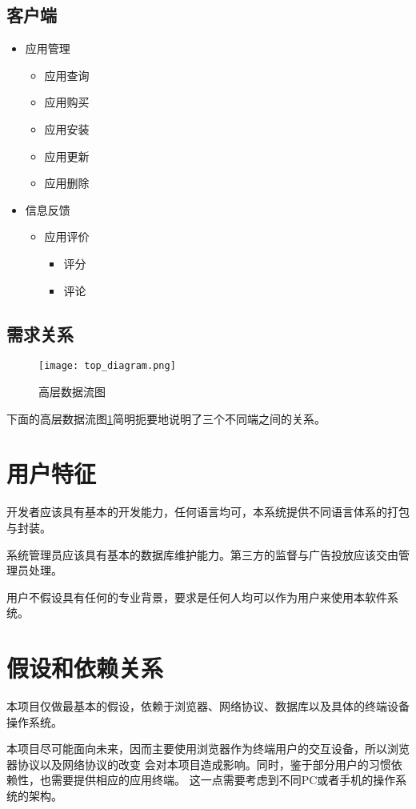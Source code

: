 \subsection{客户端}
\begin{itemize}
\item 应用管理
	\begin{itemize}
	\item 应⽤查询
	\item 应⽤购买
	\item 应⽤安装
	\item 应⽤更新
	\item 应用删除
	\end{itemize}
\item 信息反馈
	\begin{itemize}
	\item 应用评价
	\begin{itemize}
		\item 评分
		\item 评论
	\end{itemize}
	\end{itemize}
	\color{red}{
		\item 应用个性化
		\begin{itemize}
			\item 个性化配置
			\item 预览
		\end{itemize}	
		}
\end{itemize}

\subsection{需求关系}

\begin{figure}[ht]
	\centering
	\texttt{[image: top\_diagram.png]}
	\caption{高层数据流图} \label{fig:top_diagram}
\end{figure}

下面的高层数据流图\ref{fig:top_diagram}简明扼要地说明了三个不同端之间的关系。


\section{用户特征}
开发者应该具有基本的开发能力，任何语言均可，本系统提供不同语言体系的打包与封装。

系统管理员应该具有基本的数据库维护能力。第三方的监督与广告投放应该交由管理员处理。

用户不假设具有任何的专业背景，要求是任何人均可以作为用户来使用本软件系统。


\section{假设和依赖关系}
本项目仅做最基本的假设，依赖于浏览器、网络协议、数据库以及具体的终端设备操作系统。

本项目尽可能面向未来，因而主要使用浏览器作为终端用户的交互设备，所以浏览器协议以及网络协议的改变
会对本项目造成影响。同时，鉴于部分用户的习惯依赖性，也需要提供相应的应用终端。
这一点需要考虑到不同PC或者手机的操作系统的架构。


